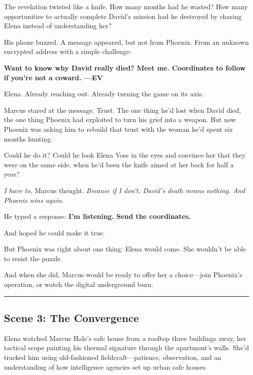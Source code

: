 The revelation twisted like a knife. How many months had he wasted? How many opportunities to actually complete David's mission had he destroyed by chasing Elena instead of understanding her?

His phone buzzed. A message appeared, but not from Phoenix. From an unknown encrypted address with a simple challenge:

\textbf{Want to know why David really died? Meet me. Coordinates to follow if you're not a coward. ---EV}

Elena. Already reaching out. Already turning the game on its axis.

Marcus stared at the message. Trust. The one thing he'd lost when David died, the one thing Phoenix had exploited to turn his grief into a weapon. But now Phoenix was asking him to rebuild that trust with the woman he'd spent six months hunting.

Could he do it? Could he look Elena Voss in the eyes and convince her that they were on the same side, when he'd been the knife aimed at her back for half a year?

\emph{I have to,} Marcus thought. \emph{Because if I don't, David's death means nothing. And Phoenix wins again.}

He typed a response: \textbf{I'm listening. Send the coordinates.}

And hoped he could make it true.

But Phoenix was right about one thing: Elena would come. She wouldn't be able to resist the puzzle.

And when she did, Marcus would be ready to offer her a choice---join Phoenix's operation, or watch the digital underground burn.

\begin{center}\rule{0.5\linewidth}{0.5pt}\end{center}

\hypertarget{scene-3-the-convergence}{%
\subsection{Scene 3: The Convergence}\label{scene-3-the-convergence}}

Elena watched Marcus Hale's safe house from a rooftop three buildings away, her tactical scope painting his thermal signature through the apartment's walls. She'd tracked him using old-fashioned fieldcraft---patience, observation, and an understanding of how intelligence agencies set up urban safe houses.

